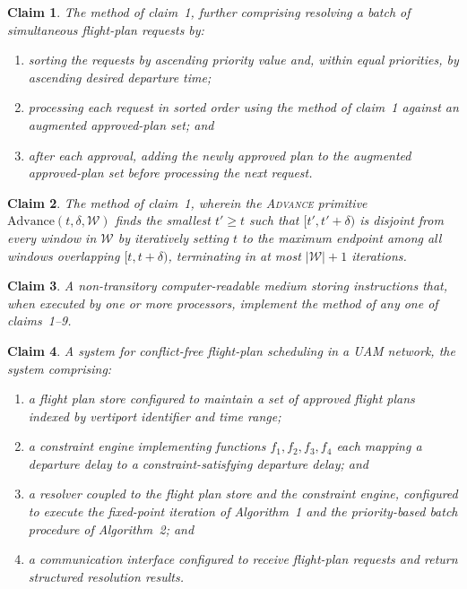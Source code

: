 \documentclass[12pt,a4paper]{article}
\newtheorem{claim}{Claim}
\begin{document}
\begin{claim}
The method of claim~1, further comprising resolving a batch of simultaneous
flight-plan requests by:
\begin{enumerate}[label=\alph*)]
  \item sorting the requests by ascending priority value and, within equal
    priorities, by ascending desired departure time;
  \item processing each request in sorted order using the method of claim~1
    against an augmented approved-plan set; and
  \item after each approval, adding the newly approved plan to the augmented
    approved-plan set before processing the next request.
\end{enumerate}
\end{claim}

\begin{claim}
The method of claim~1, wherein the \textsc{Advance} primitive
$\mathrm{Advance}(t, \delta, \mathcal{W})$ finds the smallest $t' \ge t$ such
that $[t', t'+\delta)$ is disjoint from every window in $\mathcal{W}$ by
iteratively setting $t$ to the maximum endpoint among all windows overlapping
$[t, t+\delta)$, terminating in at most $|\mathcal{W}|+1$ iterations.
\end{claim}

\begin{claim}
A non-transitory computer-readable medium storing instructions that, when
executed by one or more processors, implement the method of any one of
claims~1--9.
\end{claim}

\begin{claim}
A system for conflict-free flight-plan scheduling in a UAM network, the system
comprising:
\begin{enumerate}[label=\alph*)]
  \item a flight plan store configured to maintain a set of approved flight
    plans indexed by vertiport identifier and time range;
  \item a constraint engine implementing functions $f_1, f_2, f_3, f_4$ each
    mapping a departure delay to a constraint-satisfying departure delay; and
  \item a resolver coupled to the flight plan store and the constraint engine,
    configured to execute the fixed-point iteration of Algorithm~1 and the
    priority-based batch procedure of Algorithm~2; and
  \item a communication interface configured to receive flight-plan requests and
    return structured resolution results.
\end{enumerate}
\end{claim}
\end{document}
